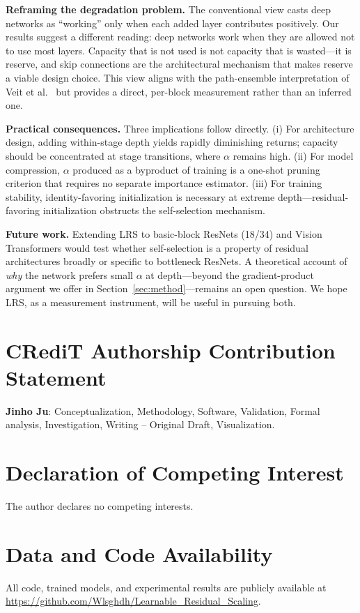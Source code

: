 \documentclass[preprint,12pt]{elsarticle}
\begin{document}
\textbf{Reframing the degradation problem.} The conventional view casts deep networks as ``working'' only when each added layer contributes positively. Our results suggest a different reading: deep networks work when they are allowed not to use most layers. Capacity that is not used is not capacity that is wasted---it is reserve, and skip connections are the architectural mechanism that makes reserve a viable design choice. This view aligns with the path-ensemble interpretation of Veit et al.~\cite{veit2016residual} but provides a direct, per-block measurement rather than an inferred one.

\textbf{Practical consequences.} Three implications follow directly. (i) For architecture design, adding within-stage depth yields rapidly diminishing returns; capacity should be concentrated at stage transitions, where $\alpha$ remains high. (ii) For model compression, $\alpha$ produced as a byproduct of training is a one-shot pruning criterion that requires no separate importance estimator. (iii) For training stability, identity-favoring initialization is necessary at extreme depth---residual-favoring initialization obstructs the self-selection mechanism.

\textbf{Future work.} Extending LRS to basic-block ResNets (18/34) and Vision Transformers would test whether self-selection is a property of residual architectures broadly or specific to bottleneck ResNets. A theoretical account of \emph{why} the network prefers small $\alpha$ at depth---beyond the gradient-product argument we offer in Section~\ref{sec:method}---remains an open question. We hope LRS, as a measurement instrument, will be useful in pursuing both.

\section*{CRediT Authorship Contribution Statement}
\textbf{Jinho Ju}: Conceptualization, Methodology, Software, Validation, Formal analysis, Investigation, Writing -- Original Draft, Visualization.

\section*{Declaration of Competing Interest}
The author declares no competing interests.

\section*{Data and Code Availability}
All code, trained models, and experimental results are publicly available at \url{https://github.com/Wlsghdh/Learnable_Residual_Scaling}.
\end{document}
